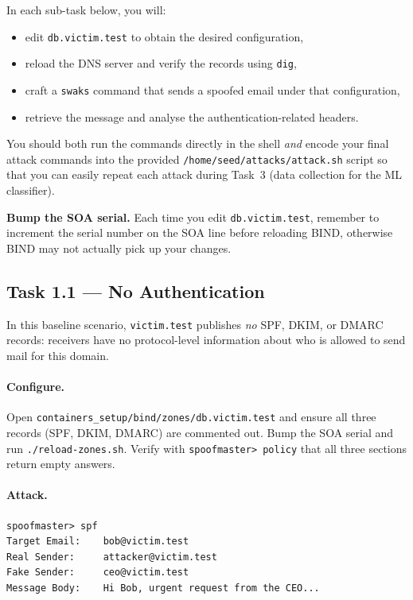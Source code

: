 \documentclass[11pt]{article}
\begin{document}
In each sub-task below, you will:

\begin{itemize}[noitemsep]
  \item edit \texttt{db.victim.test} to obtain the desired configuration,
  \item reload the DNS server and verify the records using \texttt{dig},
  \item craft a \texttt{swaks} command that sends a spoofed email under
        that configuration,
  \item retrieve the message and analyse the authentication-related
        headers.
\end{itemize}

You should both run the commands directly in the shell \emph{and} encode
your final attack commands into the provided
\texttt{/home/seed/attacks/attack.sh} script so that you can easily
repeat each attack during Task~3 (data collection for the ML
classifier).

\begin{notebox}
\textbf{Bump the SOA serial.} Each time you edit \texttt{db.victim.test},
remember to increment the serial number on the SOA line before
reloading BIND, otherwise BIND may not actually pick up your changes.
\end{notebox}

\subsection{Task 1.1 --- No Authentication}

In this baseline scenario, \texttt{victim.test} publishes \emph{no}
SPF, DKIM, or DMARC records: receivers have no protocol-level
information about who is allowed to send mail for this domain.

\paragraph{Configure.}
Open \texttt{containers\_setup/bind/zones/db.victim.test} and ensure
all three records (SPF, DKIM, DMARC) are commented out. Bump the SOA
serial and run \texttt{./reload-zones.sh}. Verify with
\texttt{spoofmaster> policy} that all three sections return empty
answers.

\paragraph{Attack.}
\begin{listing}[H]
\begin{verbatim}
spoofmaster> spf
Target Email:    bob@victim.test
Real Sender:     attacker@victim.test
Fake Sender:     ceo@victim.test
Message Body:    Hi Bob, urgent request from the CEO...
\end{verbatim}
\end{listing}
\end{document}

